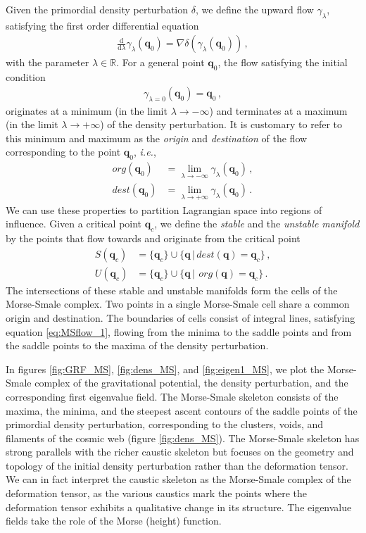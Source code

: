 \documentclass[a4paper, 11pt]{article}
\begin{document}
Given the primordial density perturbation $\delta$, we define the upward flow $\gamma_\lambda$, satisfying the first order differential equation
\begin{align}
\frac{\mathrm{d}}{\mathrm{d}\lambda} \gamma_\lambda(\bm{q}_0) = \nabla \delta(\gamma_\lambda(\bm{q}_0))\,,
\label{eq:MSflow_1}
\end{align}
with the parameter $\lambda \in \mathbb{R}$. For a general point $\bm{q}_0$, the flow satisfying the initial condition
\begin{align}
\gamma_{\lambda=0}(\bm{q}_0) = \bm{q}_0\,,
\end{align}
originates at a minimum (in the limit $\lambda \to -\infty$) and terminates at a maximum (in the limit $\lambda \to + \infty$) of the density perturbation. It is customary to refer to this minimum and maximum as the \textit{origin} and \textit{destination} of the flow corresponding to the point $\bm{q}_0$, \textit{i.e.},
\begin{align}
\textit{org}(\bm{q}_0) &= \lim_{\lambda \to -\infty}\gamma_{\lambda}(\bm{q}_0)\,,\\
\textit{dest}(\bm{q}_0) &= \lim_{\lambda \to +\infty}\gamma_{\lambda}(\bm{q}_0)\,.
\end{align}
We can use these properties to partition Lagrangian space into regions of influence. Given a critical point $\bm{q}_c$, we define the \textit{stable} and the \textit{unstable manifold} by the points that flow towards and originate from the critical point
\begin{align}
S(\bm{q}_c) &= \{\bm{q}_c\} \cup \{ \bm{q}\,|\,\textit{dest}(\bm{q})=\bm{q}_c\}\,,\\
U(\bm{q}_c) &= \{\bm{q}_c\} \cup \{ \bm{q}\,|\,\ \textit{org}(\bm{q})=\bm{q}_c\}\,.
\end{align}
The intersections of these stable and unstable manifolds form the cells of the Morse-Smale complex. Two points in a single Morse-Smale cell share a common origin and destination. The boundaries of cells consist of integral lines, satisfying equation \eqref{eq:MSflow_1}, flowing from the minima to the saddle points and from the saddle points to the maxima of the density perturbation.

In figures \ref{fig:GRF_MS}, \ref{fig:dens_MS}, and \ref{fig:eigen1_MS}, we plot the Morse-Smale complex of the gravitational potential, the density perturbation, and the corresponding first eigenvalue field. The Morse-Smale skeleton consists of the maxima, the minima, and the steepest ascent contours of the saddle points of the primordial density perturbation, corresponding to the clusters, voids, and filaments of the cosmic web (figure \ref{fig:dens_MS}). The Morse-Smale skeleton has strong parallels with the richer caustic skeleton but focuses on the geometry and topology of the initial density perturbation rather than the deformation tensor. We can in fact interpret the caustic skeleton as the Morse-Smale complex of the deformation tensor, as the various caustics mark the points where the deformation tensor exhibits a qualitative change in its structure. The eigenvalue fields take the role of the Morse (height) function.
\end{document}
